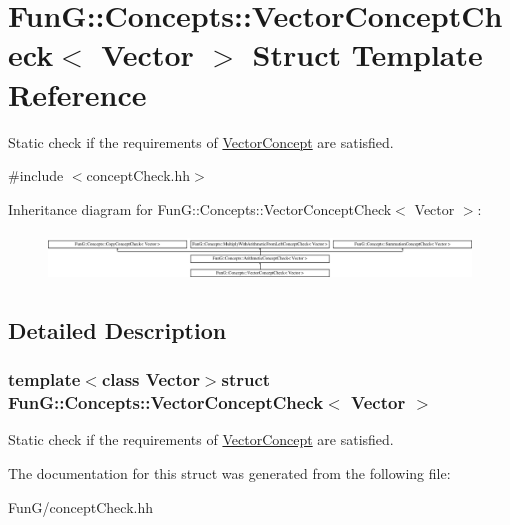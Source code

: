 \hypertarget{structFunG_1_1Concepts_1_1VectorConceptCheck}{\section{Fun\-G\-:\-:Concepts\-:\-:Vector\-Concept\-Check$<$ Vector $>$ Struct Template Reference}
\label{structFunG_1_1Concepts_1_1VectorConceptCheck}
}


Static check if the requirements of \hyperlink{structFunG_1_1Concepts_1_1VectorConcept}{Vector\-Concept} are satisfied.  




{\ttfamily \#include $<$concept\-Check.\-hh$>$}

Inheritance diagram for Fun\-G\-:\-:Concepts\-:\-:Vector\-Concept\-Check$<$ Vector $>$\-:\begin{figure}[H]
\begin{center}
\leavevmode
\includegraphics[height=1.287356cm]{structFunG_1_1Concepts_1_1VectorConceptCheck}
\end{center}
\end{figure}


\subsection{Detailed Description}
\subsubsection*{template$<$class Vector$>$struct Fun\-G\-::\-Concepts\-::\-Vector\-Concept\-Check$<$ Vector $>$}

Static check if the requirements of \hyperlink{structFunG_1_1Concepts_1_1VectorConcept}{Vector\-Concept} are satisfied. 

The documentation for this struct was generated from the following file\-:\begin{DoxyCompactItemize}
\item 
Fun\-G/concept\-Check.\-hh\end{DoxyCompactItemize}
